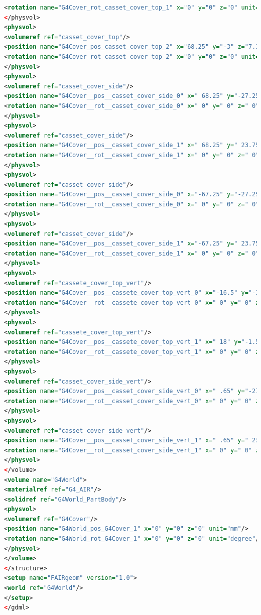 \begin{lstlisting}[language=XML, firstline=1, lastline=89]
<rotation name="G4Cover_rot_casset_cover_top_1" x="0" y="0" z="0" unit="degree"/>
</physvol>
<physvol>
<volumeref ref="casset_cover_top"/>
<position name="G4Cover_pos_casset_cover_top_2" x="68.25" y="-3" z="7.15" unit="mm"/>
<rotation name="G4Cover_rot_casset_cover_top_2" x="0" y="0" z="0" unit="degree"/>
</physvol>
<physvol>
<volumeref ref="casset_cover_side"/>
<position name="G4Cover__pos__casset_cover_side_0" x=" 68.25" y="-27.25" z="-10" unit="mm"/>
<rotation name="G4Cover__rot__casset_cover_side_0" x=" 0" y=" 0" z=" 0" unit="deg"/>
</physvol>
<physvol>
<volumeref ref="casset_cover_side"/>
<position name="G4Cover__pos__casset_cover_side_1" x=" 68.25" y=" 23.75" z="-10" unit="mm"/>
<rotation name="G4Cover__rot__casset_cover_side_1" x=" 0" y=" 0" z=" 0" unit="deg"/>
</physvol>
<physvol>
<volumeref ref="casset_cover_side"/>
<position name="G4Cover__pos__casset_cover_side_0" x="-67.25" y="-27.25" z="-10" unit="mm"/>
<rotation name="G4Cover__rot__casset_cover_side_0" x=" 0" y=" 0" z=" 0" unit="deg"/>
</physvol>
<physvol>
<volumeref ref="casset_cover_side"/>
<position name="G4Cover__pos__casset_cover_side_1" x="-67.25" y=" 23.75" z="-10" unit="mm"/>
<rotation name="G4Cover__rot__casset_cover_side_1" x=" 0" y=" 0" z=" 0" unit="deg"/>
</physvol>
<physvol>
<volumeref ref="cassete_cover_top_vert"/>
<position name="G4Cover__pos__cassete_cover_top_vert_0" x="-16.5" y="-1.5" z=" .05" unit="mm"/>
<rotation name="G4Cover__rot__cassete_cover_top_vert_0" x=" 0" y=" 0" z=" 0" unit="deg"/>
</physvol>
<physvol>
<volumeref ref="cassete_cover_top_vert"/>
<position name="G4Cover__pos__cassete_cover_top_vert_1" x=" 18" y="-1.5" z=" .05" unit="mm"/>
<rotation name="G4Cover__rot__cassete_cover_top_vert_1" x=" 0" y=" 0" z=" 0" unit="deg"/>
</physvol>
<physvol>
<volumeref ref="casset_cover_side_vert"/>
<position name="G4Cover__pos__casset_cover_side_vert_0" x=" .65" y="-27.25" z=" .05" unit="mm"/>
<rotation name="G4Cover__rot__casset_cover_side_vert_0" x=" 0" y=" 0" z=" 0" unit="deg"/>
</physvol>
<physvol>
<volumeref ref="casset_cover_side_vert"/>
<position name="G4Cover__pos__casset_cover_side_vert_1" x=" .65" y=" 23.75" z=" .05" unit="mm"/>
<rotation name="G4Cover__rot__casset_cover_side_vert_1" x=" 0" y=" 0" z=" 0" unit="deg"/>
</physvol>
</volume>
<volume name="G4World">
<materialref ref="G4_AIR"/>
<solidref ref="G4World_PartBody"/>
<physvol>
<volumeref ref="G4Cover"/>
<position name="G4World_pos_G4Cover_1" x="0" y="0" z="0" unit="mm"/>
<rotation name="G4World_rot_G4Cover_1" x="0" y="0" z="0" unit="degree"/>
</physvol>
</volume>
</structure>
<setup name="FAIRgeom" version="1.0">
<world ref="G4World"/>
</setup>
</gdml>

\end{lstlisting}

